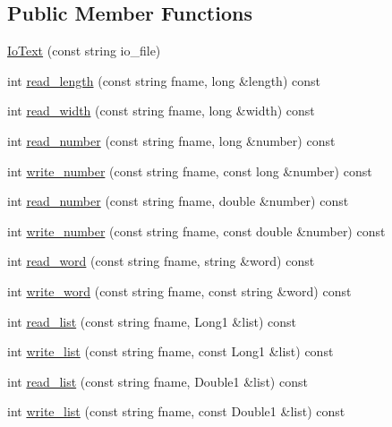 \subsection*{Public Member Functions}
\begin{DoxyCompactItemize}
\item 
\mbox{\hyperlink{structIoText_acbd0c221f311371d83bfa7588ca33ae7}{Io\+Text}} (const string io\+\_\+file)
\item 
int \mbox{\hyperlink{structIoText_a934af2596137889fa5c1327ad9deb6eb}{read\+\_\+length}} (const string fname, long \&length) const
\item 
int \mbox{\hyperlink{structIoText_aeea2eefd12d47f25389e9d6796326188}{read\+\_\+width}} (const string fname, long \&width) const
\item 
int \mbox{\hyperlink{structIoText_a8b52bfc7c9345a5d540fe05a6008eba5}{read\+\_\+number}} (const string fname, long \&number) const
\item 
int \mbox{\hyperlink{structIoText_a61c9ac128bdfbf1030ce0c3a4e8a6df8}{write\+\_\+number}} (const string fname, const long \&number) const
\item 
int \mbox{\hyperlink{structIoText_a36c615a44412abd5f1eb1dae9cc658b5}{read\+\_\+number}} (const string fname, double \&number) const
\item 
int \mbox{\hyperlink{structIoText_a6961384e467dd7a633230f1b943eee9b}{write\+\_\+number}} (const string fname, const double \&number) const
\item 
int \mbox{\hyperlink{structIoText_a5db69325c5a31309d77144498a7530cd}{read\+\_\+word}} (const string fname, string \&word) const
\item 
int \mbox{\hyperlink{structIoText_a222b88fc1ad28ebc0d2ef93642594823}{write\+\_\+word}} (const string fname, const string \&word) const
\item 
int \mbox{\hyperlink{structIoText_a2e8bfb3de876ac45dd0bf80081f75f52}{read\+\_\+list}} (const string fname, Long1 \&list) const
\item 
int \mbox{\hyperlink{structIoText_a8811cf2fddceef21dac759feb2d606f7}{write\+\_\+list}} (const string fname, const Long1 \&list) const
\item 
int \mbox{\hyperlink{structIoText_a86c3907450b95c9bbc895f5e66c266ab}{read\+\_\+list}} (const string fname, Double1 \&list) const
\item 
int \mbox{\hyperlink{structIoText_a7b2dbef1eb611ee8812b665f2499a3f9}{write\+\_\+list}} (const string fname, const Double1 \&list) const
\item 

\end{DoxyCompactItemize}
